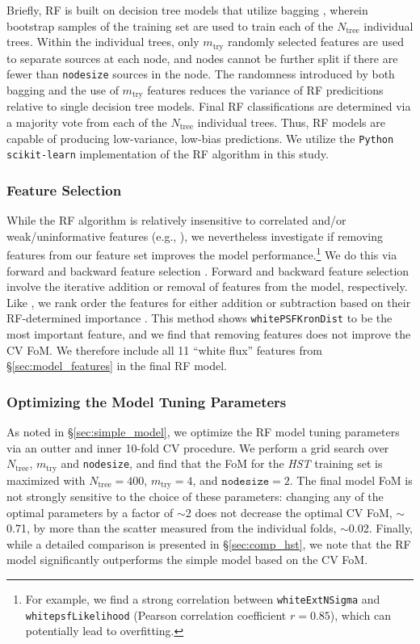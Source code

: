 \documentclass[twocolumn, dvipdfmx]{aastex62}
\begin{document}
\begin{CJK*}{UTF8}{gbsn}
Briefly, RF is built on decision tree models \citep{Quinlan93} that utilize
bagging \citep{Breiman96}, wherein bootstrap samples of the training set are
used to train each of the $N_{\mathrm{tree}}$ individual trees. Within the
individual trees, only $m_{\mathrm{try}}$ randomly selected features are
used to separate sources at each node, and nodes cannot be further split if
there are fewer than \texttt{nodesize} sources in the node. The randomness
introduced by both bagging and the use of $m_{\mathrm{try}}$ features
reduces the variance of RF predicitions relative to single decision tree
models. Final RF classifications are determined via a majority vote from
each of the $N_{\mathrm{tree}}$ individual trees. Thus, RF models are
capable of producing low-variance, low-bias predictions. We utilize the
\texttt{Python scikit-learn} implementation of the RF algorithm
\citep{Pedregosa12} in this study.

\subsubsection{Feature Selection}

While the RF algorithm is relatively insensitive to correlated and/or
weak/uninformative features (e.g., \citealt{Richards12a}), we nevertheless
investigate if removing features from our feature set improves the model
performance.\footnote{For example, we find a strong correlation between
\texttt{whiteExtNSigma} and \texttt{whitepsfLikelihood} (Pearson correlation
coefficient $r = 0.85$), which can potentially lead to overfitting.} We do
this via forward and backward feature selection \citep{Guyon03}. Forward and
backward feature selection involve the iterative addition or removal of
features from the model, respectively. Like \citet{Richards12a}, we rank
order the features for either addition or subtraction based on their
RF-determined importance \citep{Breiman02}. This method shows
\texttt{whitePSFKronDist} to be the most important feature, and we find that
removing features does not improve the CV FoM. We therefore include all 11
``white flux'' features from \S\ref{sec:model_features} in the final RF
model.

\subsubsection{Optimizing the Model Tuning Parameters}

As noted in \S\ref{sec:simple_model}, we optimize the RF model tuning
parameters via an outter and inner 10-fold CV procedure. We perform a grid
search over $N_{\mathrm{tree}}$, $m_{\mathrm{try}}$ and \texttt{nodesize},
and find that the FoM for the \textit{HST} training set is maximized with
$N_{\mathrm{tree}} = 400$, $m_{\mathrm{try}} = 4$, and $\mathtt{nodesize} =
2$. The final model FoM is not strongly sensitive to the choice of these
parameters: changing any of the optimal parameters by a factor of $\sim$2
does not decrease the optimal CV FoM, $\sim$0.71, by more than the scatter
measured from the individual folds, $\sim$0.02. Finally, while a detailed
comparison is presented in \S\ref{sec:comp_hst}, we note that the RF model
significantly outperforms the simple model based on the CV FoM.


\end{CJK*}
\end{document}
